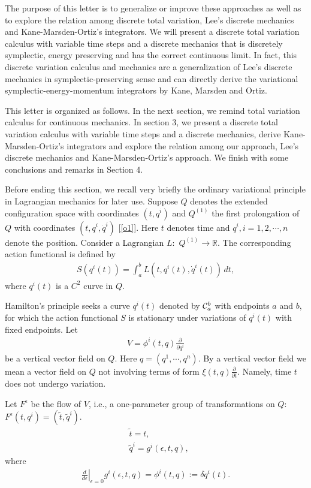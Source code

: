 \documentclass[a4paper,a4paper]{article}
\begin{document}
The purpose of this letter is to generalize or improve these
approaches as well as to explore the relation among  discrete
total
variation, Lee's discrete mechanics and Kane-Marsden-Ortiz's
integrators. We will present a   discrete total variation calculus
with variable time steps and a discrete mechanics that is
discretely symplectic, energy preserving and has the correct
continuous limit. In fact, this discrete variation calculus and
mechanics are a generalization of Lee's discrete mechanics in
symplectic-preserving sense and can directly derive the
variational symplectic-energy-momentum integrators by Kane,
Marsden and Ortiz.

This letter is organized as follows. In the next section, we
remind total variation calculus for continuous mechanics.
 In section 3, we present a   discrete total variation calculus with variable
time steps and a discrete mechanics,  derive Kane-Marsden-Ortiz's
integrators and explore the relation among our approach, Lee's
discrete mechanics and Kane-Marsden-Ortiz's approach.
  We finish with some conclusions and remarks in Section 4.


Before ending this section, we recall very briefly the ordinary
variational principle in Lagrangian mechanics for later use.
 Suppose $Q$ denotes the extended
configuration space with coordinates $(t, q^i)$ and $Q^{(1)}$ the
first prolongation of $Q$ with coordinates $(t, q^i, \dot{q}^{i})$
[\ref{o1}]. Here $t$ denotes time and $q^i, i=1, 2, \cdots, n$
denote the position.
  Consider a Lagrangian
$L:\,\, Q^{(1)} \to \mathbb{R}$. The corresponding action functional is defined by
\begin{align}
    S(q^i(t))=\int_{a}^{b}L(t, q^i(t), \dot{q}^{i}(t))\,dt, \label{1.1}
\end{align}
where $q^{i}(t)$ is a $C^{2}$ curve in $Q$.

Hamilton's principle seeks a curve $q^i(t)$ denoted by ${\cal C}_a^b$ with
endpoints $a$ and $b$,  for which the action functional $S$ is
stationary under variations of $q^i(t)$ with fixed endpoints.
\noindent Let
\begin{align}
   V=\phi^i(t,q)\frac{\partial}{\partial q^i} \label{1.2}
\end{align}
be a vertical vector field on $Q$. Here
$q=(q^{1},\cdots, q^{n})$.
By a vertical vector field we mean a vector field on $Q$ not
involving terms of form $\xi(t,q) \frac{\partial}{\partial t}$.
Namely, time $t$ does not undergo
variation.

Let $F^{\epsilon}$ be the flow of $V$, i.e., a one-parameter group of transformations on
$Q$: $F^{\epsilon}(t,q^i)=(\tilde
{t}, \tilde{q}^i)$.
\begin{align}
 &\tilde{t}=t,\label{1.3a}\\&
\tilde{q}^i=g^i(\epsilon, t, q),\label{1.3}
\end{align}
where
\begin{align}
   \left.\frac{d}{d\epsilon}\right|_{\epsilon=0}g^i(\epsilon, t, q)
   =\phi^i(t,q):=\delta q^i(t). \label{1.4}
\end{align}
\noindent
\end{document}
